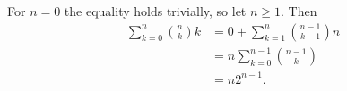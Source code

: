 For $n=0$ the equality holds trivially, so let $n\ge1$.
Then
\begin{align*}
    \sum_{k=0}^n\binom{n}{k}k &= 0+\sum_{k=1}^n\binom{n-1}{k-1}n \tag{by identity (C.9)} \\
    &= n\sum_{k=0}^{n-1}\binom{n-1}{k} \\[1mm]
    &= n2^{n-1} \tag{by indentity (C.4) where $x=y=1$}.
\end{align*}
